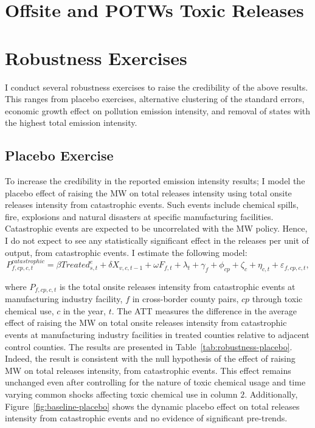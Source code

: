 \documentclass[12pt, english]{article}
\begin{document}
    \section{Offsite and POTWs Toxic Releases}\label{sec:offsite-and-potws-toxic-releases}
    
    
    


    \section{Robustness Exercises}\label{sec:robustness-exercises}
    I conduct several robustness exercises to raise the credibility of the above results. This ranges from placebo exercises, alternative clustering of the standard errors, economic growth effect on pollution emission intensity, and removal of states with the highest total emission intensity.

    \subsection{Placebo Exercise}\label{subsec:placebo-exercise}
    To increase the credibility in the reported emission intensity results; I model the placebo effect of raising the MW on total releases intensity using total onsite releases intensity from catastrophic events. Such events include chemical spills, fire, explosions and natural disasters at specific manufacturing facilities. Catastrophic events are expected to be uncorrelated with the MW policy. Hence, I do not expect to see any statistically significant effect in the releases per unit of output, from catastrophic events. I estimate the following model:
    \begin{equation}
        P_{f,cp,c,t}^{catastrophic} = \beta Treated_{s,t}^e + \delta X_{v,c,t-1} + \omega F_{f,t} + \lambda_{t} + \gamma_{f} + \phi_{cp} + \zeta_{c} + \eta_{c,t} + \varepsilon_{f,cp,c,t},\label{eq:robustness-placebo}
    \end{equation}
    

    where $P_{f,cp,c,t}$ is the total onsite releases intensity from catastrophic events at manufacturing industry facility, $f$ in cross-border county pairs, $cp$ through toxic chemical use, $c$ in the year, $t$. The ATT measures the difference in the average effect of raising the MW on total onsite releases intensity from catastrophic events at manufacturing industry facilities in treated counties relative to adjacent control counties. The results are presented in Table~\ref{tab:robustness-placebo}. Indeed, the result is consistent with the null hypothesis of the effect of raising MW on total releases intensity, from catastrophic events. This effect remains unchanged even after controlling for the nature of toxic chemical usage and time varying common shocks affecting toxic chemical use in column $2$. Additionally, Figure~\ref{fig:baseline-placebo} shows the dynamic placebo effect on total releases intensity from catastrophic events and no evidence of significant pre-trends.
    
\end{document}
